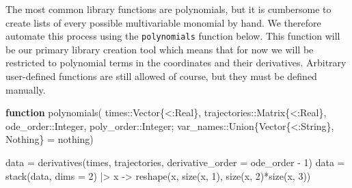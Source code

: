 \documentclass[
]{article}
\newenvironment{Shaded}{\begin{snugshade}}{\end{snugshade}}
\newcommand{\ConstantTok}[1]{\textcolor[rgb]{0.56,0.35,0.01}{#1}}
\newcommand{\DataTypeTok}[1]{\textcolor[rgb]{0.68,0.00,0.00}{#1}}
\newcommand{\FloatTok}[1]{\textcolor[rgb]{0.68,0.00,0.00}{#1}}
\newcommand{\FunctionTok}[1]{\textcolor[rgb]{0.28,0.35,0.67}{#1}}
\newcommand{\KeywordTok}[1]{\textcolor[rgb]{0.00,0.23,0.31}{\textbf{#1}}}
\newcommand{\NormalTok}[1]{\textcolor[rgb]{0.00,0.23,0.31}{#1}}
\newcommand{\OperatorTok}[1]{\textcolor[rgb]{0.37,0.37,0.37}{#1}}
\newcommand*\circled[1]{\tikz[baseline=(char.base)]{
          \node[shape=circle,draw,inner sep=1pt] (char) {{\scriptsize#1}};}}
\begin{document}
The most common library functions are polynomials, but it is cumbersome
to create lists of every possible multivariable monomial by hand. We
therefore automate this process using the \texttt{polynomials} function
below. This function will be our primary library creation tool which
means that for now we will be restricted to polynomial terms in the
coordinates and their derivatives. Arbitrary user-defined functions are
still allowed of course, but they must be defined manually.

\begin{tcolorbox}[enhanced jigsaw, bottomrule=.15mm, toprule=.15mm, coltitle=black, colframe=quarto-callout-tip-color-frame, colbacktitle=quarto-callout-tip-color!10!white, bottomtitle=1mm, toptitle=1mm, opacitybacktitle=0.6, titlerule=0mm, title={Compute arbitrary polynomial functions of variables and their
derivatives (Julia implementation)}, left=2mm, leftrule=.75mm, rightrule=.15mm, breakable, colback=white, arc=.35mm, opacityback=0]

\label{annotated-cell-20}%
\begin{Shaded}
\begin{Highlighting}[]
\KeywordTok{function} \FunctionTok{polynomials}\NormalTok{(}
\NormalTok{  times}\OperatorTok{::}\DataTypeTok{Vector\{\textless{}:Real\}}\NormalTok{,}
\NormalTok{  trajectories}\OperatorTok{::}\DataTypeTok{Matrix\{\textless{}:Real\}}\NormalTok{, }
\NormalTok{  ode\_order}\OperatorTok{::}\DataTypeTok{Integer}\NormalTok{, }\hspace*{\fill}\NormalTok{\circled{1}}
\NormalTok{  poly\_order}\OperatorTok{::}\DataTypeTok{Integer}\NormalTok{; }\hspace*{\fill}\NormalTok{\circled{2}}
\NormalTok{  var\_names}\OperatorTok{::}\DataTypeTok{Union\{Vector\{\textless{}:String\}, Nothing\} }\OperatorTok{=} \ConstantTok{nothing}\NormalTok{) }\hspace*{\fill}\NormalTok{\circled{3}}

\NormalTok{  data }\OperatorTok{=} \FunctionTok{derivatives}\NormalTok{(times, trajectories, derivative\_order }\OperatorTok{=}\NormalTok{ ode\_order }\OperatorTok{{-}} \FloatTok{1}\NormalTok{)}
\NormalTok{  data }\OperatorTok{=} \FunctionTok{stack}\NormalTok{(data, dims }\OperatorTok{=} \FloatTok{2}\NormalTok{) }\OperatorTok{|\textgreater{}} 
\NormalTok{    x }\OperatorTok{{-}\textgreater{}} \FunctionTok{reshape}\NormalTok{(x, }\FunctionTok{size}\NormalTok{(x, }\FloatTok{1}\NormalTok{), }\FunctionTok{size}\NormalTok{(x, }\FloatTok{2}\NormalTok{)}\FunctionTok{*size}\NormalTok{(x, }\FloatTok{3}\NormalTok{))}
  

\end{Highlighting}
\end{Shaded}
\end{tcolorbox}
\end{document}
